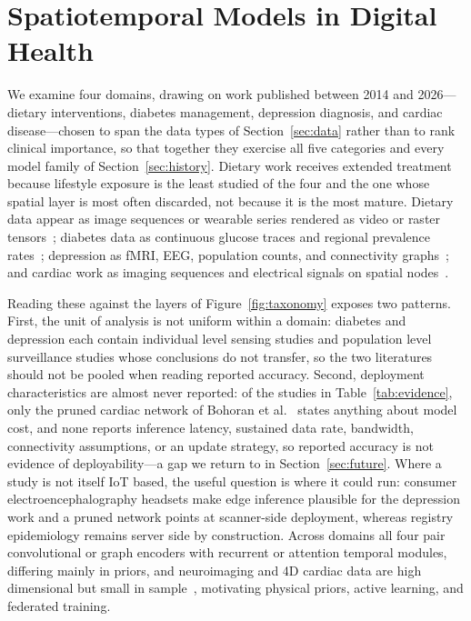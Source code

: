 \documentclass[journal]{IEEEtran}
\newif\ifsubmission
\begin{document}
\section{Spatiotemporal Models in Digital Health}
\label{sec:models}
\ifsubmission
We examine four domains, drawing on work published between 2014 and 2026---dietary interventions, diabetes management, depression diagnosis, and cardiac disease---chosen to span the data types of Section~\ref{sec:data} rather than to rank clinical importance, so that together they exercise all five categories and every model family of Section~\ref{sec:history}. Dietary work receives extended treatment because lifestyle exposure is the least studied of the four and the one whose spatial layer is most often discarded, not because it is the most mature. Dietary data appear as image sequences or wearable series rendered as video or raster tensors~\cite{Rouast2020IntakeGesture,Kyritsis2019EatingBehavior}; diabetes data as continuous glucose traces and regional prevalence rates~\cite{Li2020GluNet,XiaoLi2016DiabetesSpatiotemporal}; depression as fMRI, EEG, population counts, and connectivity graphs~\cite{2,3,4,9}; and cardiac work as imaging sequences and electrical signals on spatial nodes~\cite{5,6,7}.

Reading these against the layers of Figure~\ref{fig:taxonomy} exposes two patterns. First, the unit of analysis is not uniform within a domain: diabetes and depression each contain individual level sensing studies and population level surveillance studies whose conclusions do not transfer, so the two literatures should not be pooled when reading reported accuracy. Second, deployment characteristics are almost never reported: of the studies in Table~\ref{tab:evidence}, only the pruned cardiac network of Bohoran et al.~\cite{5} states anything about model cost, and none reports inference latency, sustained data rate, bandwidth, connectivity assumptions, or an update strategy, so reported accuracy is not evidence of deployability---a gap we return to in Section~\ref{sec:future}. Where a study is not itself IoT based, the useful question is where it could run: consumer electroencephalography headsets make edge inference plausible for the depression work and a pruned network points at scanner-side deployment, whereas registry epidemiology remains server side by construction. Across domains all four pair convolutional or graph encoders with recurrent or attention temporal modules, differing mainly in priors, and neuroimaging and 4D cardiac data are high dimensional but small in sample~\cite{4,5,6}, motivating physical priors, active learning, and federated training.
\end{document}
